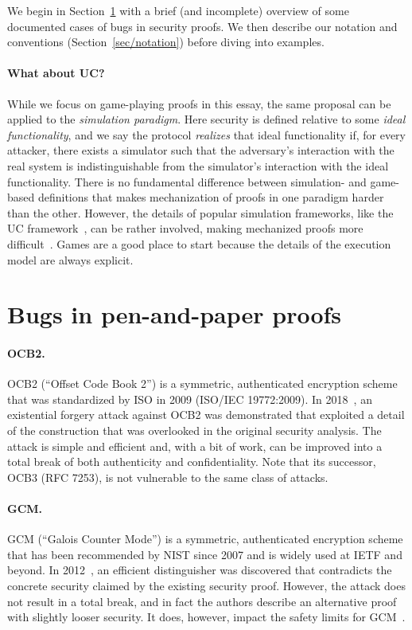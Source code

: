 \documentclass{article}
\begin{document}
We begin in Section~\ref{sec/bugs} with a brief (and incomplete) overview of
some documented cases of bugs in security proofs.
%
We then describe our notation and conventions (Section~\ref{sec/notation})
before diving into examples.

\paragraph{What about UC?}
%
While we focus on game-playing proofs in this essay, the same proposal can be
applied to the \emph{simulation paradigm}. Here security is defined relative to
some \emph{ideal functionality}, and we say the protocol \emph{realizes} that
ideal functionality if, for every attacker, there exists a simulator such that
the adversary's interaction with the real system is indistinguishable from the
simulator's interaction with the ideal functionality.
%
There is no fundamental difference between simulation- and game-based
definitions that makes mechanization of proofs in one paradigm harder than the
other.
%
However, the details of popular simulation frameworks, like the UC
framework~\cite{Can01}, can be rather involved, making mechanized proofs more
difficult~\cite{CSV19}.
%
Games are a good place to start because the details of the execution model are
always explicit.

\section{Bugs in pen-and-paper proofs}\label{sec/bugs}

\paragraph{OCB2.}
%
OCB2 (``Offset Code Book 2'') is a symmetric, authenticated encryption scheme
that was standardized by ISO in 2009 (ISO/IEC 19772:2009). In
2018~\cite{IIMP19}, an existential forgery attack against OCB2 was demonstrated
that exploited a detail of the construction that was overlooked in the original
security analysis.
%
The attack is simple and efficient and, with a bit of work, can be improved
into a total break of both authenticity and confidentiality.
%
Note that its successor, OCB3 (RFC 7253), is not vulnerable to the same class
of attacks.

\paragraph{GCM.}
%
GCM (``Galois Counter Mode'') is a symmetric, authenticated encryption scheme
that has been recommended by NIST since 2007 and is widely used at IETF and
beyond.
%
In 2012~\cite{IOM12}, an efficient distinguisher was discovered that
contradicts the concrete security claimed by the existing security proof.
%
However, the attack does not result in a total break, and in fact the authors
describe an alternative proof with slightly looser security.
%
It does, however, impact the safety limits for GCM~\cite{irtf-cfrg-aead-limits-08}.
\end{document}

